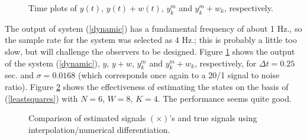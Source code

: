 \begin{figure}[thb]
\centerline{}
\smallskip
\caption{Time plots of $y(t)$, $y(t) + w(t)$, $y^m_k$ and $y^m_k + w_k$, 
respectively.}
\label{figdynamicsampled}
\end{figure}

The output of system (\ref{dynamic}) has a fundamental frequency 
of about 1 Hz., so the sample rate for the system was selected as
4 Hz.; this is probably a little too slow, but will
challenge the observers to be designed.
Figure \ref{figdynamicsampled} shows the output of the system (\ref{dynamic}),
$y$, $y + w$, $y^m_k$ and $y^m_k + w_k$, respectively, for $\Delta t = 0.25$
sec. and  $\sigma= 0.0168$ (which
corresponds once again to a 20/1 signal to noise ratio). Figure
\ref{figdynamicinterp} shows the effectiveness of estimating the states
on the basis of (\ref{leastsquares}) with $N = 6$,
$W=8$, $K=4$.  The performance seems quite good.

\begin{figure}[hbt]
\centerline{}
\smallskip
\caption{Comparison of estimated signals $(\times)$'s and true
signals using interpolation/numerical differentiation.}
\label{figdynamicinterp}
\end{figure}

